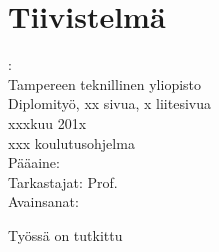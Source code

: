 \documentclass[12pt,a4paper,finnish]{tutthesis}
\begin{document}



\chapter*{Tiivistelmä}         %

\begin{spacing}{1.0}
         {\bf \textsf{\MakeUppercase{\@author}}}: \@title\\  %
         \textsf{Tampereen teknillinen yliopisto}\\
         \textsf{Diplomityö, xx sivua, x liitesivua}\\ %
         \textsf{xxxkuu 201x}\\
         \textsf{xxx koulutusohjelma}\\
         \textsf{Pääaine: }\\
         \textsf{Tarkastajat:  Prof. \@examiner}\\ %
         \textsf{Avainsanat: }\\
\end{spacing}





Työssä on tutkittu


\end{document}
